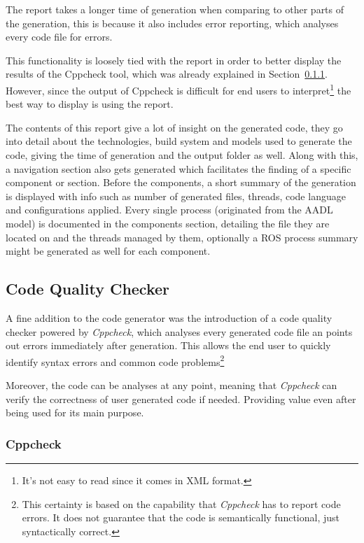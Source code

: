 The report takes a longer time of generation when comparing to other parts of the generation, this is because it also includes error reporting, which analyses every code file for errors.

This functionality is loosely tied with the report in order to better display the results of the Cppcheck tool, which was already explained in Section~\ref{sec:impl_side_cppchecker}. However, since the output of Cppcheck is difficult for end users to interpret\footnote{It's not easy to read since it comes in XML format.} the best way to display is using the report.

The contents of this report give a lot of insight on the generated code, they go into detail about the technologies, build system and models used to generate the code, giving the time of generation and the output folder as well. Along with this, a navigation section also gets generated which facilitates the finding of a specific component or section. Before the components, a short summary of the generation is displayed with info such as number of generated files, threads, code language and configurations applied. Every single process (originated from the \gls{AADL} model) is documented in the components section, detailing the file they are located on and the threads managed by them, optionally a \gls{ROS} process summary might be generated as well for each component. 

\subsection{Code Quality Checker}
\label{sec:impl_code_qual_checker}

A fine addition to the code generator was the introduction of a code quality checker powered by \textit{Cppcheck}, which analyses every generated code file an points out errors immediately after generation. This allows the end user to quickly identify syntax errors and common code problems\footnote{This certainty is based on the capability that \textit{Cppcheck} has to report code errors. It does not guarantee that the code is semantically functional, just syntactically correct.}

Moreover, the code can be analyses at any point, meaning that \textit{Cppcheck} can verify the correctness of user generated code if needed. Providing value even after being used for its main purpose.

\subsubsection{Cppcheck}
\label{sec:impl_side_cppchecker}

